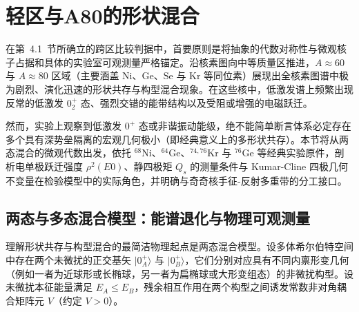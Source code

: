 \section{轻区与A80的形状混合}\label{sec:4-2}

在第~4.1~节所确立的跨区比较判据中，首要原则是将抽象的代数对称性与微观核子占据和具体的实验室可观测量严格锚定。沿核素图向中等质量区推进，$A\approx 60$ 与 $A\approx 80$ 区域（主要涵盖 $\mathrm{Ni}$、$\mathrm{Ge}$、$\mathrm{Se}$ 与 $\mathrm{Kr}$ 等同位素）展现出全核素图谱中极为剧烈、演化迅速的形状共存与构型混合现象。在这些核中，低激发谱上频繁出现反常的低激发 $0^+_2$ 态、强烈交错的能带结构以及受阻或增强的电磁跃迁。

然而，实验上观察到低激发 $0^+$ 态或非谐振动能级，绝不能简单断言体系必定存在多个具有深势垒隔离的宏观几何极小（即经典意义上的多形状共存）。本节将从两态混合的微观代数出发，依托 $^{68}\mathrm{Ni}$、$^{64}\mathrm{Ge}$、$^{74,76}\mathrm{Kr}$ 与 $^{76}\mathrm{Ge}$ 等经典实验原件，剖析电单极跃迁强度 $\rho^2(E0)$、静四极矩 $Q_s$ 的测量条件与 Kumar-Cline 四极几何不变量在检验模型中的实际角色，并明确与奇奇核手征-反射多重带的分工接口。

\subsection{两态与多态混合模型：能谱退化与物理可观测量}\label{sec:4-2-1}

理解形状共存与构型混合的最简洁物理起点是两态混合模型。设多体希尔伯特空间中存在两个未微扰的正交基矢 $|0^+_A\rangle$ 与 $|0^+_B\rangle$，它们分别对应具有不同内禀形变几何（例如一者为近球形或长椭球，另一者为扁椭球或大形变组态）的非微扰构型。设未微扰本征能量满足 $E_A \le E_B$，残余相互作用在两个构型之间诱发常数非对角耦合矩阵元 $V$（约定 $V > 0$）。

